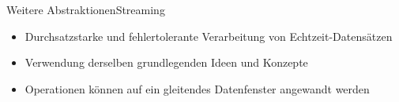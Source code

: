 \begin{frame}[t]{Weitere Abstraktionen}{Streaming}
	\begin{itemize}
		\item Durchsatzstarke und fehlertolerante Verarbeitung von Echtzeit-Datensätzen
		\item Verwendung derselben grundlegenden Ideen und Konzepte
		\item Operationen können auf ein gleitendes Datenfenster angewandt werden
	\end{itemize}

\end{frame}
